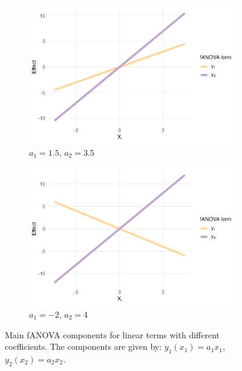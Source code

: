 \begin{figure}[htpb]
    \centering
    \begin{subfigure}[t]{0.49\textwidth}
        \centering
        \includegraphics[width=\textwidth]{images/experiment_section/linear_a1p15_a2p35_a11p00_a22p00_a12p00_rhop00_main.png}
        \caption{$a_1 = 1.5$, $a_2 = 3.5$}
    \end{subfigure}%
    \hfill
    \begin{subfigure}[t]{0.49\textwidth}
        \centering
        \includegraphics[width=\textwidth]{images/experiment_section/linear_a1m20_a2p40_a11p00_a22p00_a12p00_rhop00_main.png}
        \caption{$a_1 = -2$, $a_2 = 4$}
    \end{subfigure}
    \caption{Main fANOVA components for linear terms with different coefficients. The components are given by: $y_1(x_1) = a_1 x_1$, $y_2(x_2) = a_2 x_2$.}
    \label{fig:linear_main_effects}
\end{figure}


